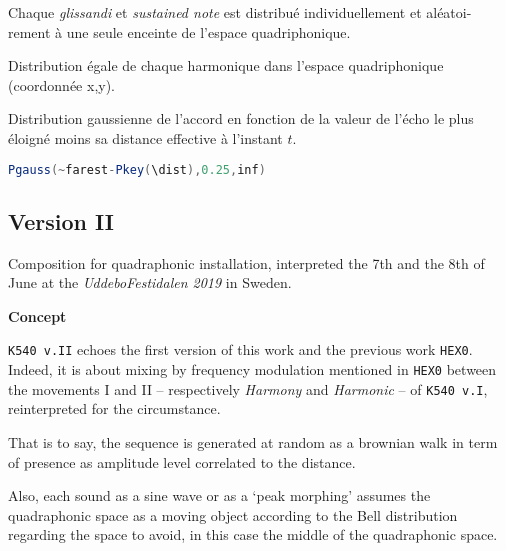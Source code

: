 \begin{description}[itemsep=10pt]
\item[Mvt \texttt{[1]}]
\hfill

Chaque \textit{glissandi} et \textit{sustained note} est distribu\'e individuellement et al\'eatoi- rement \`a une seule enceinte de l'espace quadriphonique.
\item[Mvt \texttt{[2]}]
\hfill

Distribution \'egale de chaque harmonique dans l'espace quadriphonique (coordonn\'ee x,y).

\item[Mvt \texttt{[3]}]
\hfill

Distribution gaussienne de l'accord en fonction de la valeur de l'\'echo le plus \'eloign\'e moins sa distance effective \`a l'instant $t$.
  \begin{lstlisting}[basicstyle=\footnotesize\ttfamily,language=Java]
 Pgauss(~farest-Pkey(\dist),0.25,inf)
\end{lstlisting}
\end{description}

\subsection[\texttt{v.II}]{Version II}

\smallskip

Composition for quadraphonic installation, interpreted the 7th and the 8th of June at the \textit{UddeboFestidalen 2019} in Sweden.

\bigskip

\noindent \textbf{{\large Concept}}
\hrulefill

\bigskip

\texttt{K540 v.II} echoes the first version of this work and the previous work \texttt{HEX0}. Indeed, it is about mixing by frequency modulation mentioned in \texttt{HEX0} between the movements I and II -- respectively \textsl{Harmony} and \textsl{Harmonic} -- of  \texttt{K540 v.I}, reinterpreted for the circumstance. 

That is to say, the sequence is generated at random as a brownian walk in term of presence as amplitude level correlated to the distance.

Also, each sound as a sine wave or as a `peak morphing'  assumes the quadraphonic space as a moving object according to the Bell distribution regarding the space to avoid, in this case the middle of the quadraphonic space.

